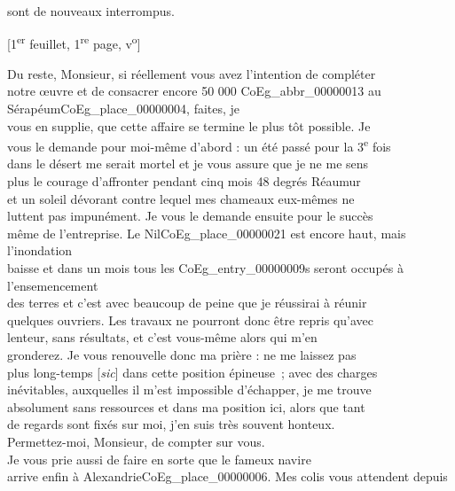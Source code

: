 \documentclass{book}
\begin{document}
sont de nouveaux interrompus.
{\footnotesize\begin{center} {[1\textsuperscript{er} feuillet, 1\textsuperscript{re} page, v\textsuperscript{o}]}\end{center}}
\indent Du reste, Monsieur, si réellement vous avez l’intention de compléter\\
notre œuvre et de consacrer encore 50 000 \gls{CoEg_abbr_00000013} au Sérapéum\gls{CoEg_place_00000004}, faites, je\\
vous en supplie, que cette affaire se termine le plus tôt possible. Je\\
vous le demande pour moi-même d’abord : un été passé pour la 3\textsuperscript{e} fois\\
dans le désert me serait mortel et je vous assure que je ne me sens\\
plus le courage d’affronter pendant cinq mois 48 degrés Réaumur\\
et un soleil dévorant contre lequel mes chameaux eux-mêmes ne\\
luttent pas impunément. Je vous le demande ensuite pour le succès\\
même de l’entreprise. Le Nil\gls{CoEg_place_00000021} est encore haut, mais l’inondation\\
baisse et dans un mois tous les \glspl{CoEg_entry_00000009} seront occupés à l’ensemencement\\
des terres et c’est avec beaucoup de peine que je réussirai à réunir\\
quelques ouvriers. Les travaux ne pourront donc être repris qu’avec\\
lenteur, sans résultats, et c’est vous-même alors qui m’en\\
gronderez. Je vous renouvelle donc ma prière : ne me laissez pas\\
plus long-temps [\textit{sic}] dans cette position épineuse~; avec des charges\\
inévitables, auxquelles il m’est impossible d’échapper, je me trouve\\
absolument sans ressources et dans ma position ici, alors que tant\\
de regards sont fixés sur moi, j’en suis très souvent honteux.\\
Permettez-moi, Monsieur, de compter sur vous.\\
\indent Je vous prie aussi de faire en sorte que le fameux navire\\
arrive enfin à Alexandrie\gls{CoEg_place_00000006}. Mes colis vous attendent depuis\\
\end{document}
